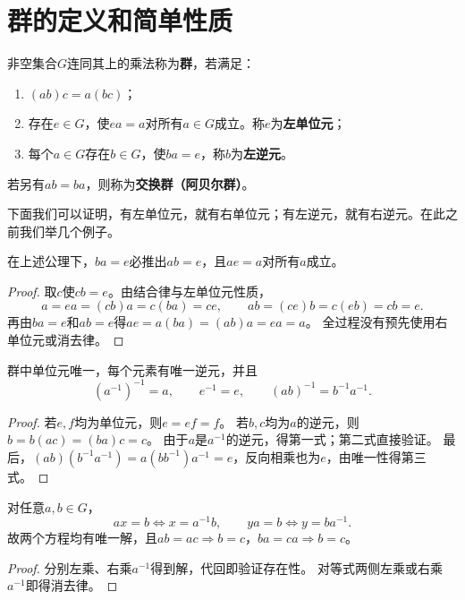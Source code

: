 \section{群的定义和简单性质}
\begin{definition}
非空集合$G$连同其上的乘法称为\textbf{群}，若满足：
\begin{enumerate}
\item $(ab)c=a(bc)$；
\item 存在$e\in G$，使$ea=a$对所有$a\in G$成立。称$e$为\textbf{左单位元}；
\item 每个$a\in G$存在$b\in G$，使$ba=e$，称$b$为\textbf{左逆元}。
\end{enumerate}


若另有$ab=ba$，则称为\textbf{交换群（阿贝尔群）}。
\end{definition}
下面我们可以证明，有左单位元，就有右单位元；有左逆元，就有右逆元。在此之前我们举几个例子。

\begin{proposition}
在上述公理下，$ba=e$必推出$ab=e$，且$ae=a$对所有$a$成立。
\end{proposition}
\begin{proof}
取$c$使$cb=e$。由结合律与左单位元性质，
\[
a=ea=(cb)a=c(ba)=ce,
\qquad ab=(ce)b=c(eb)=cb=e.
\]
再由$ba=e$和$ab=e$得$ae=a(ba)=(ab)a=ea=a$。
全过程没有预先使用右单位元或消去律。
\end{proof}

\begin{proposition}
群中单位元唯一，每个元素有唯一逆元，并且
\[
(a^{-1})^{-1}=a,\qquad e^{-1}=e,\qquad (ab)^{-1}=b^{-1}a^{-1}.
\]
\end{proposition}
\begin{proof}
若$e,f$均为单位元，则$e=ef=f$。
若$b,c$均为$a$的逆元，则$b=b(ac)=(ba)c=c$。
由于$a$是$a^{-1}$的逆元，得第一式；第二式直接验证。
最后，$(ab)(b^{-1}a^{-1})=a(bb^{-1})a^{-1}=e$，反向相乘也为$e$，由唯一性得第三式。
\end{proof}

\begin{proposition}
对任意$a,b\in G$，
\[
ax=b\iff x=a^{-1}b,\qquad ya=b\iff y=ba^{-1}.
\]
故两个方程均有唯一解，且$ab=ac\Rightarrow b=c$，$ba=ca\Rightarrow b=c$。
\end{proposition}
\begin{proof}
分别左乘、右乘$a^{-1}$得到解，代回即验证存在性。
对等式两侧左乘或右乘$a^{-1}$即得消去律。
\end{proof}



